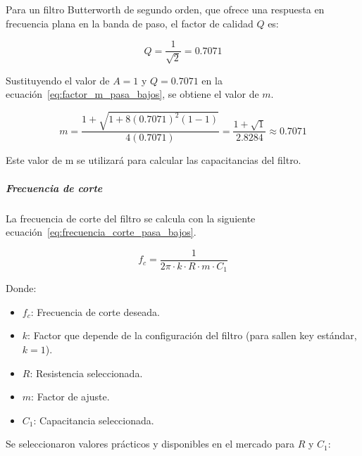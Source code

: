                     Para un filtro Butterworth de segundo orden, que ofrece una respuesta en frecuencia plana en la banda de paso, el factor de calidad $Q$ es:

                    \begin{equation}
                        Q = \frac{1}{\sqrt{2}} = 0.7071
                    \end{equation}

                    Sustituyendo el valor de $A = 1$ y $Q = 0.7071$ en la ecuación~\ref{eq:factor_m_pasa_bajos}, se obtiene el valor de $m$.

                    \begin{equation}
                        \label{eq:factor_m_pasa_bajos_valor}
                        m = \frac{1+\sqrt{1+8(0.7071)^2(1-1)}}{4(0.7071)} = \frac{1 + \sqrt{1}}{2.8284}\approx 0.7071
                    \end{equation}

                    Este valor de m se utilizará para calcular las capacitancias del filtro.

                \subparagraph{Frecuencia de corte}
                    La frecuencia de corte del filtro se calcula con la siguiente ecuación~\ref{eq:frecuencia_corte_pasa_bajos}.

                    \begin{equation}
                        \label{eq:frecuencia_corte_pasa_bajos}
                        f_c = \frac{1}{2\pi \cdot k \cdot R \cdot m \cdot C_1}
                    \end{equation}

                    Donde:
                    \begin{itemize}
                        \item $f_c$: Frecuencia de corte deseada.
                        \item $k$: Factor que depende de la configuración del filtro (para sallen key estándar, $k = 1$).
                        \item $R$: Resistencia seleccionada.
                        \item $m$: Factor de ajuste.
                        \item $C_1$: Capacitancia seleccionada.
                    \end{itemize}

                    Se seleccionaron valores prácticos y disponibles en el mercado para $R$ y $C_1$:

